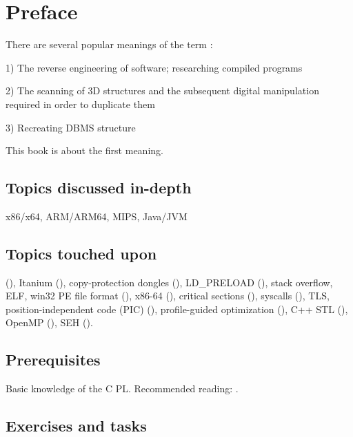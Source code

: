 \section*{Preface}

There are several popular meanings of the term :

1) The reverse engineering of software; researching compiled programs

2) The scanning of 3D structures and the subsequent digital manipulation required in order to duplicate them

3) Recreating \ac{DBMS} structure

This book is about the first meaning.

\subsection*{Topics discussed in-depth}

x86/x64, ARM/ARM64, MIPS, Java/JVM

\subsection*{Topics touched upon}

\oracle (),
Itanium (),
copy-protection dongles (),
LD\_PRELOAD (),
stack overflow,
\ac{ELF},
win32 PE file format (),
x86-64 (),
critical sections (),
syscalls (),
\ac{TLS},
position-independent code (\ac{PIC}) (),
profile-guided optimization (),
C++ STL (),
OpenMP (),
SEH ().

\subsection*{Prerequisites}

Basic knowledge of the C \ac{PL}.
Recommended reading: .

\subsection*{Exercises and tasks}

